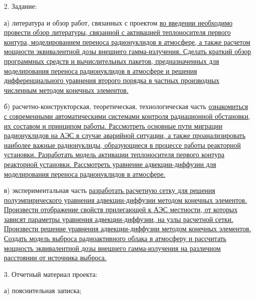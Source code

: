 2. Задание:

\hspace{1cm} а) литература и обзор работ, связанных с проектом \ul{во введении необходимо провести обзор литературы, связанной с 
активацией теплоносителя первого контура, моделированием переноса радионуклидов в атмосфере, а также расчетом мощности 
эквивалентной дозы внешнего гамма-излучения. Сделать краткий обзор программных средств и вычислительных пакетов, предназначенных 
для моделирования переноса радионуклидов в атмосфере и решения дифференциального уравнения второго порядка в частных производных 
численным методом конечных элементов.}

\hspace{1cm} б) расчетно-конструкторская, теоретическая, технологическая часть \ul{ознакомиться с современными 
автоматическими системами контроля радиационной обстановки, их составом и принципом работы. Рассмотреть основные пути 
миграции радионуклидов на АЭС в случае аварийной ситуации, а также проанализировать наиболее важные радионуклиды,
образующиеся в процессе работы реакторной установки. Разработать модель активации теплоносителя первого контура 
реакторной установки. Рассмотреть уравнение адвекции-диффузии для моделирования переноса радионуклидов в атмосфере.}

\hspace{1cm} в) экспериментальная часть \ul{разработать расчетную сетку для решения полуэмпирического уравнения 
адвекции-диффузии методом конечных элементов. Произвести отображение свойств прилегающей к АЭС местности, от которых 
зависят параметры уравнения адвекции-диффузии, на узлы расчетной сетки. Произвести решение уравнения адвекции-диффузии 
методом конечных элементов. Создать модель выброса радиоактивного облака в атмосферу и рассчитать мощность эквивалентной 
дозы внешнего гамма-излучения на различном расстоянии от источника выброса.}

3. Отчетный материал проекта:

\hspace{1cm} а) пояснительная записка;

